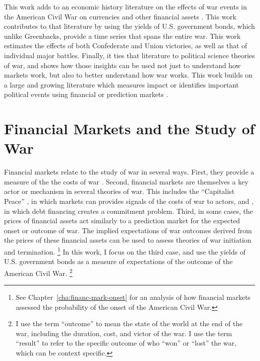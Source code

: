 This work adds to an economic history literature on the effects of war events in the American Civil War on currencies and other financial assets \parencites{Mitchell1903}{Mitchell1908}{Schwab1901}{Roll1972}{Calomiris1988}{DavisPecquet1990}{WillardGuinnaneEtAl1996}{McCandless1996}{SmithSmith1997}{BrownBurdekin2000}{Weidenmier2000}{Weidenmier2002}{HaberMitchenerOosterlinckEtAl2014}.
This work contributes to that literature by using the yields of U.S. government bonds, which unlike Greenbacks, provide a time series that spans the entire war. 
This work estimates the effects of both Confederate and Union victories, as well as that of individual major battles.
Finally, it ties that literature to political science theories of war, and shows how those insights can be used not just to understand how markets work, but also to better understand how war works.
This work builds on a large and growing literature which measures impact or identifies important political events using financial \parencites{NorthWeingast1989}{north2000introd}{FreyKucher2000}{sussman2000instit}{wells2000revol}{Herron2000}{eldor2004finan}{ChenSiems2004}{Greenstone2007} or prediction markets \parencites{WolfersZitzewitz2004}{ArrowForsytheGorhamEtAl2008}{WolfersZitzewitz2009}.




\section{Financial Markets and the Study of War}
\label{sec:barg-theory-war}

Financial markets relate to the study of war in several ways.
First, they provide a measure of the the costs of war \parencites{SchneiderTroeger2006}{GuidolinLaFerrara2010}.
Second, financial markets are themselves a key actor or mechanism in several theories of war.
This includes the ``Capitalist Peace'' \parencites{Gartzke2007}{DafoeKelsey2014a}, in which markets can provides signals of the costs of war to actors, and \textcite{Slantchev2012a}, in which debt financing creates a commitment problem.
Third, in some cases, the prices of financial assets act similarly to a prediction market for the expected onset or outcome of war.
The implied expectations of war outcomes  derived from the prices of these financial assets can be used to assess theories of war initiation and termination.%
\footnote{See Chapter~\ref{cha:financ-mark-onset} for an analysis of how financial markets assessed the probability of the onset of the American Civil War.}
In this work, I focus on the third case, and use the yields of U.S. government bonds as a measure of expectations of the outcome of the American Civil War.%
\footnote{
  I use the term ``outcome'' to mean the state of the world at the end of the war, including the duration, cost, and victor of the war.
  I use the term ``result'' to refer to the specific outcome of who ``won'' or ``lost'' the war, which can be context specific.
}

